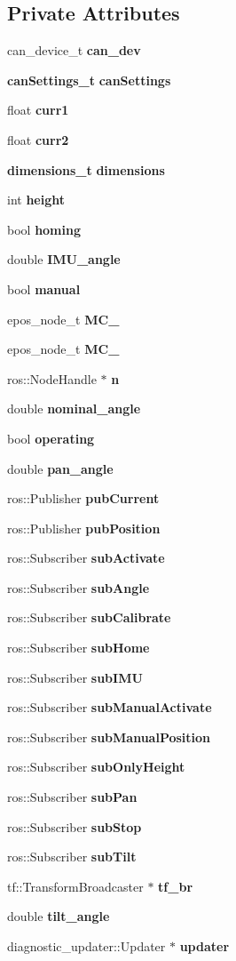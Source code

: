 \subsection*{\-Private \-Attributes}
\begin{DoxyCompactItemize}
\item 
can\-\_\-device\-\_\-t {\bf can\-\_\-dev}
\item 
{\bf can\-Settings\-\_\-t} {\bf can\-Settings}
\item 
float {\bf curr1}
\item 
float {\bf curr2}
\item 
{\bf dimensions\-\_\-t} {\bf dimensions}
\item 
int {\bf height}
\item 
bool {\bf homing}
\item 
double {\bf \-I\-M\-U\-\_\-angle}
\item 
bool {\bf manual}
\item 
epos\-\_\-node\-\_\-t {\bf \-M\-C\-\_}
\item 
epos\-\_\-node\-\_\-t {\bf \-M\-C\-\_}
\item 
ros\-::\-Node\-Handle $\ast$ {\bf n}
\item 
double {\bf nominal\-\_\-angle}
\item 
bool {\bf operating}
\item 
double {\bf pan\-\_\-angle}
\item 
ros\-::\-Publisher {\bf pub\-Current}
\item 
ros\-::\-Publisher {\bf pub\-Position}
\item 
ros\-::\-Subscriber {\bf sub\-Activate}
\item 
ros\-::\-Subscriber {\bf sub\-Angle}
\item 
ros\-::\-Subscriber {\bf sub\-Calibrate}
\item 
ros\-::\-Subscriber {\bf sub\-Home}
\item 
ros\-::\-Subscriber {\bf sub\-I\-M\-U}
\item 
ros\-::\-Subscriber {\bf sub\-Manual\-Activate}
\item 
ros\-::\-Subscriber {\bf sub\-Manual\-Position}
\item 
ros\-::\-Subscriber {\bf sub\-Only\-Height}
\item 
ros\-::\-Subscriber {\bf sub\-Pan}
\item 
ros\-::\-Subscriber {\bf sub\-Stop}
\item 
ros\-::\-Subscriber {\bf sub\-Tilt}
\item 
tf\-::\-Transform\-Broadcaster $\ast$ {\bf tf\-\_\-br}
\item 
double {\bf tilt\-\_\-angle}
\item 
diagnostic\-\_\-updater\-::\-Updater $\ast$ {\bf updater}
\end{DoxyCompactItemize}


